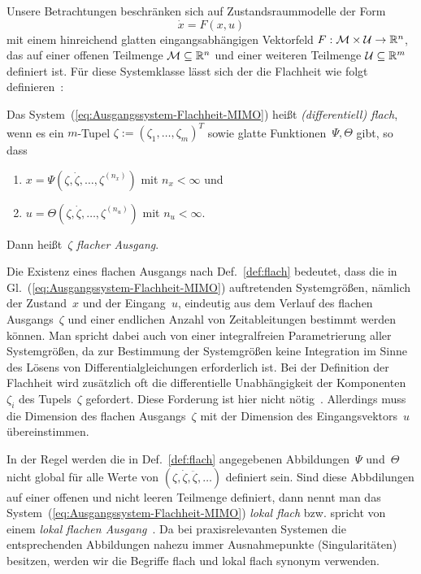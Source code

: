 Unsere Betrachtungen beschränken sich auf Zustandsraummodelle der
Form 
\begin{equation}
\dot{x}=F(x,u)\label{eq:Ausgangssystem-Flachheit-MIMO}
\end{equation}
mit einem hinreichend glatten eingangsabhängigen Vektorfeld $F:\mathcal{M}\times\mathcal{U}\to{\mathbb{R}}^{n}$,
das auf einer offenen Teilmenge $\mathcal{M}\subseteq{\mathbb{R}}^{n}$ und
einer weiteren Teilmenge $\mathcal{U}\subseteq{\mathbb{R}}^{m}$ definiert ist.
Für diese Systemklasse lässt sich der die Flachheit wie folgt definieren~\cite{rudolph2003habil}:
\begin{definition}
\label{def:flach}Das System~(\ref{eq:Ausgangssystem-Flachheit-MIMO})
heißt \emph{(differentiell) flach}, wenn es ein $m$-Tupel
$\zeta:=(\zeta_{1},\ldots,\zeta_{m})^{T}$ sowie glatte Funktionen~$\Psi,\Theta$
gibt, so dass
\begin{enumerate}
\item \label{enu:flach1}$x=\Psi(\zeta,\dot{\zeta},\ldots,\zeta^{(n_{x})})$
mit $n_{x}<\infty$ und
\item \label{enu:flach2}$u=\Theta(\zeta,\dot{\zeta},\ldots,\zeta^{(n_{u})})$
mit $n_{u}<\infty$.
\end{enumerate}
Dann heißt~$\zeta$ \emph{flacher Ausgang}.
\end{definition}

Die Existenz eines flachen Ausgangs nach Def.~\ref{def:flach} bedeutet,
dass die in Gl.~(\ref{eq:Ausgangssystem-Flachheit-MIMO}) auftretenden
Systemgrößen, nämlich der Zustand~$x$ und der Eingang~$u$, eindeutig
aus dem Verlauf des flachen Ausgangs~$\zeta$ und einer endlichen
Anzahl von Zeitableitungen bestimmt werden können. Man spricht dabei
auch von einer integralfreien Parametrierung aller Systemgrößen, da
zur Bestimmung der Systemgrößen keine Integration im Sinne des Lösens
von Differentialgleichungen erforderlich ist. Bei der Definition der
Flachheit wird zusätzlich oft die differentielle Unabhängigkeit der
Komponenten~$\zeta_{i}$ des Tupels~$\zeta$ gefordert. Diese Forderung
ist hier nicht nötig~\cite{fliess1999}. Allerdings muss die Dimension
des flachen Ausgangs~$\zeta$ mit der Dimension des Eingangsvektors~$u$
übereinstimmen.

In der Regel werden die in Def.~\ref{def:flach} angegebenen Abbildungen~$\Psi$
und~$\Theta$ nicht global für alle Werte von $(\zeta,\dot{\zeta},\ddot{\zeta},\ldots)$
definiert sein. Sind diese Abbdilungen auf einer offenen und nicht
leeren Teilmenge definiert, dann nennt man das System~(\ref{eq:Ausgangssystem-Flachheit-MIMO})
\emph{lokal flach} bzw. spricht von einem \emph{lokal flachen Ausgang}~\cite{levine2007equivalence,levine2011}.
Da bei praxisrelevanten Systemen die entsprechenden Abbildungen nahezu
immer Ausnahmepunkte (Singularitäten) besitzen, werden wir die Begriffe
flach und lokal flach synonym verwenden.

